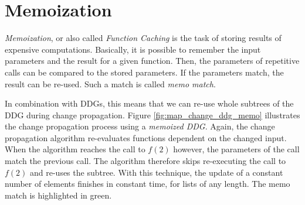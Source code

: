 \section{Memoization}

\textit{Memoization}, or also called \textit{Function Caching} is the task of storing results of expensive computations. Basically, it is possible to remember the input parameters and the result for a given function. Then, the parameters of repetitive calls can be compared to the stored parameters. If the parameters match, the result can be re-used. Such a match is called \textit{memo match}.

In combination with DDGs, this means that we can re-use whole subtrees of the DDG during change propagation. Figure \ref{fig:map_change_ddg_memo} illustrates the change propagation process using a \textit{memoized DDG}. Again, the change propagation algorithm re-evaluates functions dependent on the changed input. When the algorithm reaches the call to $f(2)$ however, the parameters of the call match the previous call. The algorithm therefore skips re-executing the call to $f(2)$ and re-uses the subtree. With this technique, the update of a constant number of elements finishes in constant time, for lists of any length. 
The memo match is highlighted in green. 


